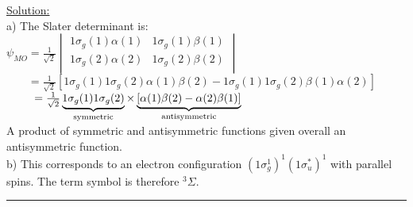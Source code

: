 \noindent
\underline{Solution:}\\

\noindent
a) The Slater determinant is:\\
$\psi_{MO} = \frac{1}{\sqrt{2}}\begin{vmatrix}
1\sigma_g(1)\alpha(1) & 1\sigma_g(1)\beta(1)\\
1\sigma_g(2)\alpha(2) & 1\sigma_g(2)\beta(2)\\
\end{vmatrix}
$\\
$
\phantom{\psi_{MO}} = \frac{1}{\sqrt{2}}\left[ 1\sigma_g(1)1\sigma_g(2)\alpha(1)\beta(2)
- 1\sigma_g(1)1\sigma_g(2)\beta(1)\alpha(2)\right]
$\\
$
\phantom{\psi_{MO}} = \frac{1}{\sqrt{2}}\underbrace{1\sigma_g(1)1\sigma_g(2)}_{\textnormal{symmetric}}\times
\underbrace{\left[\alpha(1)\beta(2) - \alpha(2)\beta(1)\right]}_{\textnormal{antisymmetric}}
$\\
A product of symmetric and antisymmetric functions given overall an antisymmetric
function.\\

\noindent
b) This corresponds to an electron configuration $(1\sigma^1_g)^1(1\sigma^*_u)^1$
with parallel spins. The term symbol is therefore $^3\Sigma$.\\

\hrule\vspace{0.5cm}

